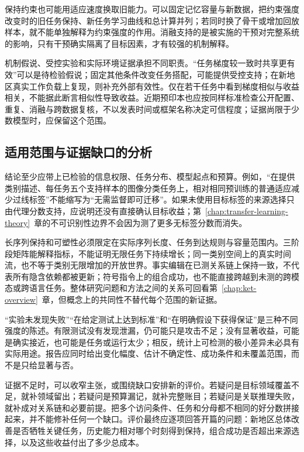 保持约束也可能用适应速度换取旧能力。可以固定记忆容量与新数据，把约束强度改变时的旧任务保持、新任务学习曲线和总计算并列；若同时换了骨干或增加回放样本，就不能单独解释为约束强度的作用。消融支持的是被实施的干预对完整系统的影响，只有干预确实隔离了目标因素，才有较强的机制解释。

机制假说、受控实验和实际环境证据承担不同职责。“任务梯度较一致时共享更有效”可以是待检验假说；固定其他条件改变任务搭配，可能提供受控支持；在新地区真实工作负载上复现，则补充外部有效性。仅在若干任务中看到梯度相似与收益相关，不能据此断言相似性导致收益。近期预印本也应按同样标准检查公开配置、重复、消融与跨数据复核，不以发表时间或框架名称决定可信程度；证据尚限于少数模型时，应保留这个范围。

\subsection{适用范围与证据缺口的分析}
\label{sec:ket-evaluation-limits}

结论至少应带上已检验的信息权限、任务分布、模型起点和预算。例如，“在提供类别描述、每任务五个支持样本的图像分类任务上，相对相同预训练的普通适应减少过线标签”不能缩写为“无需监督即可迁移”。如果未使用目标标签的来源选择只由代理分数支持，应说明还没有直接确认目标收益；第~\ref{chap:transfer-learning-theory}~章的不可识别性边界不会因为测了更多无标签分数而消失。

长序列保持和可塑性必须限定在实际序列长度、任务到达规则与容量范围内。三阶段矩阵能解释指标，不能证明无限任务下持续增长；同一类别空间上的真实时间流，也不等于类别无限增加的开放世界。事实编辑在已测关系链上保持一致，不代表所有隐含依赖都被更新；符号指令上的组合成功，也不能直接跨越到未测的跨模态或跨语言任务。整体研究问题和方法之间的关系可回看第~\ref{chap:ket-overview}~章，但概念上的共同性不替代每个范围的新证据。

“实验未发现失败”“在给定测试上达到标准”和“在明确假设下获得保证”是三种不同强度的陈述。有限测试没有发现泄漏，仍可能只是攻击不足；没有显著收益，可能是确实接近，也可能是任务或运行太少；相反，统计上可检测的极小差异未必具有实际用途。报告应同时给出变化幅度、估计不确定性、成功条件和未覆盖范围，而不是只给显著与否。

证据不足时，可以收窄主张，或围绕缺口安排新的评价。若疑问是目标领域覆盖不足，就补领域留出；若疑问是预算漏记，就补完整账目；若疑问是关联推理失败，就补成对关系链和必要前提。把多个访问条件、任务和分母都不相同的好分数拼接起来，并不能修补任何一个缺口。评价最终应逐项回答开篇的问题：新地区总体改善是否牺牲关键任务，历史能力相对哪个时刻得到保持，组合成功是否超出来源选择，以及这些收益付出了多少总成本。

